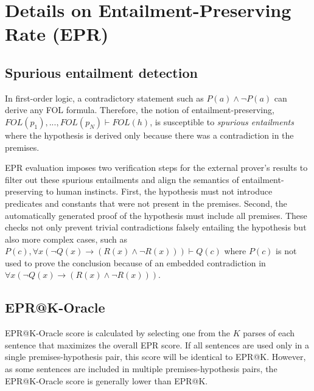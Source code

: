 \section{Details on Entailment-Preserving Rate (EPR)}
\label{sec:appendix-epr}

\subsection{Spurious entailment detection}

In first-order logic, a contradictory statement such as $P(a) \land \lnot P(a)$ can derive any FOL formula. Therefore, the notion of entailment-preserving, $FOL(p_1), ..., FOL(p_N) \vdash FOL(h)$, is susceptible to \textit{spurious entailments} where the hypothesis is derived only because there was a contradiction in the premises.

EPR evaluation imposes two verification steps for the external prover's results to filter out these spurious entailments and align the semantics of entailment-preserving to human instincts. First, the hypothesis must not introduce predicates and constants that were not present in the premises. Second, the automatically generated proof of the hypothesis must include all premises. These checks not only prevent trivial contradictions falsely entailing the hypothesis but also more complex cases, such as $P(c), \forall x(\lnot Q(x) \rightarrow (R(x) \land \lnot R(x))) \vdash Q(c)$ where $P(c)$ is not used to prove the conclusion because of an embedded contradiction in $\forall x(\lnot Q(x) \rightarrow (R(x) \land \lnot R(x)))$.

\subsection{EPR@K-Oracle}
\label{sec:appendix-oracle}

EPR@K-Oracle score is calculated by selecting one from the $K$ parses of each sentence that maximizes the overall EPR score. If all sentences are used only in a single premises-hypothesis pair, this score will be identical to EPR@K. However, as some sentences are included in multiple premises-hypothesis pairs, the EPR@K-Oracle score is generally lower than EPR@K.

